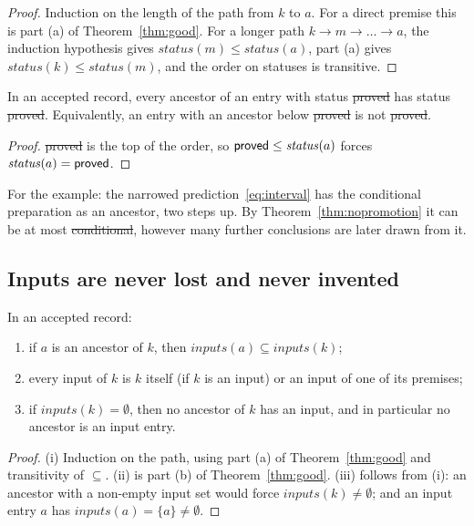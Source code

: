 \begin{proof}
Induction on the length of the path from $k$ to $a$. For a direct premise this is part (a) of Theorem~\ref{thm:good}. For a longer path
$k\to m\to\dots\to a$, the induction hypothesis gives $\mathit{status}(m)\le\mathit{status}(a)$, part (a) gives
$\mathit{status}(k)\le\mathit{status}(m)$, and the order on statuses is transitive.
\end{proof}

\begin{corollary}\label{cor:proved}
In an accepted record, every ancestor of an entry with status \st{proved} has status \st{proved}. Equivalently, an entry with an ancestor
below \st{proved} is not \st{proved}.
\end{corollary}

\begin{proof}
\st{proved} is the top of the order, so $\textsf{proved}\le\mathit{status}(a)$ forces $\mathit{status}(a)=\textsf{proved}$.
\end{proof}

For the example: the narrowed prediction~\eqref{eq:interval} has the conditional preparation as an ancestor, two steps up. By
Theorem~\ref{thm:nopromotion} it can be at most \st{conditional}, however many further conclusions are later drawn from it.

\subsection{Inputs are never lost and never invented}

\begin{theorem}[Inputs]\label{thm:inputs}
In an accepted record:
\begin{enumerate}[label=(\roman*),nosep,leftmargin=2em]
\item if $a$ is an ancestor of $k$, then $\mathit{inputs}(a)\subseteq\mathit{inputs}(k)$;
\item every input of $k$ is $k$ itself (if $k$ is an input) or an input of one of its premises;
\item if $\mathit{inputs}(k)=\emptyset$, then no ancestor of $k$ has an input, and in particular no ancestor is an input entry.
\end{enumerate}
\end{theorem}

\begin{proof}
(i) Induction on the path, using part (a) of Theorem~\ref{thm:good} and transitivity of $\subseteq$. (ii) is part (b) of
Theorem~\ref{thm:good}. (iii) follows from (i): an ancestor with a non-empty input set would force $\mathit{inputs}(k)\neq\emptyset$;
and an input entry $a$ has $\mathit{inputs}(a)=\{a\}\neq\emptyset$.
\end{proof}

